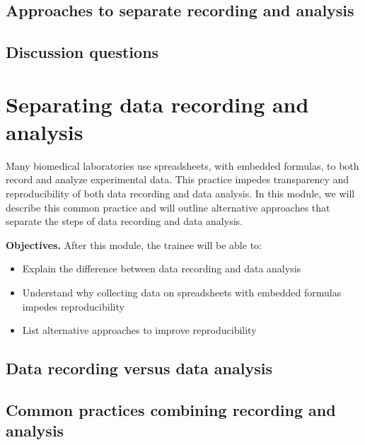 \documentclass[]{tufte-book}
\providecommand{\tightlist}{%
  \setlength{\itemsep}{0pt}\setlength{\parskip}{0pt}}
\begin{document}
\hypertarget{approaches-to-separate-recording-and-analysis-6}{%
\subsection{Approaches to separate recording and analysis}\label{approaches-to-separate-recording-and-analysis-6}}

\hypertarget{discussion-questions-6}{%
\subsection{Discussion questions}\label{discussion-questions-6}}

\hypertarget{separating-data-recording-and-analysis-7}{%
\section{Separating data recording and analysis}\label{separating-data-recording-and-analysis-7}}

Many biomedical laboratories use spreadsheets, with embedded formulas, to both
record and analyze experimental data. This practice impedes transparency and
reproducibility of both data recording and data analysis. In this module, we
will describe this common practice and will outline alternative approaches that
separate the steps of data recording and data analysis.

\textbf{Objectives.} After this module, the trainee will be able to:

\begin{itemize}
\tightlist
\item
  Explain the difference between data recording and data analysis
\item
  Understand why collecting data on spreadsheets with embedded formulas impedes
  reproducibility
\item
  List alternative approaches to improve reproducibility
\end{itemize}

\hypertarget{data-recording-versus-data-analysis-7}{%
\subsection{Data recording versus data analysis}\label{data-recording-versus-data-analysis-7}}

\hypertarget{common-practices-combining-recording-and-analysis-7}{%
\subsection{Common practices combining recording and analysis}\label{common-practices-combining-recording-and-analysis-7}}
\end{document}
